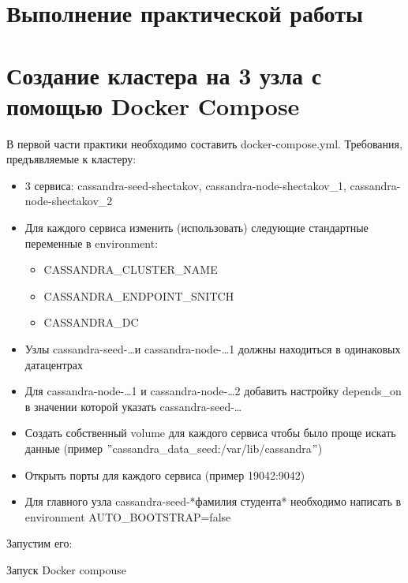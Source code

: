 \graphicspath{{/img}} %

\section*{\LARGE Выполнение практической работы}

\section{Создание кластера на 3 узла с помощью Docker Compose}

В первой части практики необходимо составить docker-compose.yml.
Требования, предъявляемые к кластеру:
\begin{itemize}
	\item 3 сервиса: cassandra-seed-shectakov, cassandra-node-shectakov\_1, cassandra-node-shectakov\_2
	\item Для каждого сервиса изменить (использовать) следующие
	стандартные переменные в environment:
	\begin{itemize}
		\item CASSANDRA\_CLUSTER\_NAME
		\item CASSANDRA\_ENDPOINT\_SNITCH
		\item CASSANDRA\_DC
	\end{itemize}
	\item Узлы cassandra-seed-\ldots и cassandra-node-\ldots1 должны
	находиться в одинаковых датацентрах
	\item Для cassandra-node-\ldots1 и cassandra-node-\ldots2 добавить
	настройку depends\_on в значении которой указать cassandra-seed-\ldots
	\item Создать собственный volume для каждого сервиса чтобы было проще
	искать данные (пример \("\)cassandra\_data\_seed:/var/lib/cassandra\("\))
	\item Открыть порты для каждого сервиса (пример 19042:9042)
	\item Для главного узла cassandra-seed-*фамилия студента*
	необходимо написать в environment AUTO\_BOOTSTRAP=false
\end{itemize}



Запустим его:

\begin{image}
	\caption{Запуск Docker compouse}
	\label{fig:docker}
\end{image}

